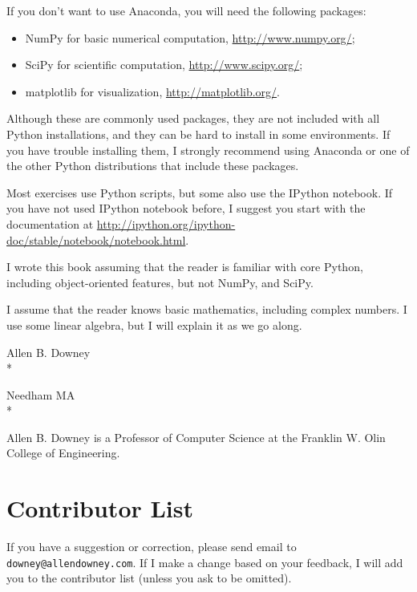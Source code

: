 \documentclass[12pt]{book}
\begin{document}
If you don't want to use Anaconda, you will need the following
packages:

\begin{itemize}

\item NumPy for basic numerical computation, \url{http://www.numpy.org/};

\item SciPy for scientific computation,
  \url{http://www.scipy.org/};

\item matplotlib for visualization, \url{http://matplotlib.org/}.

\end{itemize}

Although these are commonly used packages, they are not included with
all Python installations, and they can be hard to install in some
environments.  If you have trouble installing them, I strongly
recommend using Anaconda or one of the other Python distributions
that include these packages.

Most exercises use Python scripts, but some also use the IPython
notebook.  If you have not used IPython notebook before, I suggest
you start with the documentation at
\url{http://ipython.org/ipython-doc/stable/notebook/notebook.html}.

I wrote this book assuming that the reader is familiar with core Python,
including object-oriented features, but not
NumPy, and SciPy.

I assume that the reader knows basic mathematics, including complex
numbers.  I use some linear algebra, but I will explain it as we
go along.


Allen B. Downey \\*

Needham MA \\*

Allen B. Downey is a Professor of Computer Science at 
the Franklin W. Olin College of Engineering.



\section*{Contributor List}

If you have a suggestion or correction, please send email to 
{\tt downey@allendowney.com}.  If I make a change based on your
feedback, I will add you to the contributor list
(unless you ask to be omitted).
\end{document}
